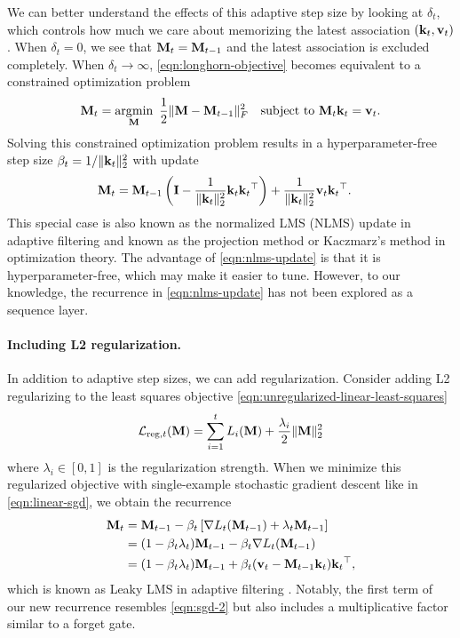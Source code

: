 \documentclass[notitlepage, 11pt]{article}
\begin{document}
We can better understand the effects of this adaptive step size by looking at $\delta_t$, which controls how much we care about memorizing the latest association $(\mathbf{k}_t, \mathbf{v}_t)$.
When $\delta_t = 0$, we see that $\mathbf{M}_t = \mathbf{M}_{t-1}$ and the latest association is excluded completely.
When $\delta_t \to \infty$, \autoref{eqn:longhorn-objective} becomes equivalent to a constrained optimization problem
\begin{align}
\mathbf{M}_{t} = \operatorname*{\arg\!\min}_{\mathbf{M}}\ \frac{1}{2}\lVert\mathbf{M} - \mathbf{M}_{t-1}\rVert_F^2\quad \text{subject to}\  \mathbf{M}_t\mathbf{k}_t = \mathbf{v}_t.\label{eqn:nlms-objective}
\end{align}
Solving this constrained optimization problem results in a hyperparameter-free step size $\beta_t=1/\lVert\mathbf{k}_t\rVert_2^2$ with update
\begin{align}
    \mathbf{M}_{t} &= \mathbf{M}_{t-1}\left(\mathbf{I} - \frac{1}{\lVert\mathbf{k}_t\rVert_2^2} {\mathbf{k}_t\mathbf{k}_t{}^\top}\right) + \frac{1}{ \lVert\mathbf{k}_t\rVert_2^2}\mathbf{v}_t\mathbf{k}_t{}^\top.\label{eqn:nlms-update}
\end{align}
This special case is also known as the normalized LMS (NLMS) update in adaptive filtering \citep{Castoldi2009MinimumdisturbanceDescriptionDevelopment} and known as the projection method \citep{Tanabe1971ProjectionMethodSolving} or Kaczmarz's method \citep{Kaczmarz1937AngenaherteAuflosungSystemen} in optimization theory.
The advantage of \autoref{eqn:nlms-update} is that it is hyperparameter-free, which may make it easier to tune.
However, to our knowledge, the recurrence in \autoref{eqn:nlms-update} has not been explored as a sequence layer.

\paragraph{Including L2 regularization.}
In addition to adaptive step sizes, we can add regularization.
Consider adding L2 regularizing to the least squares objective \autoref{eqn:unregularized-linear-least-squares}
\begin{align}
    \mathcal{L}_{\text{reg}, t}(\mathbf{M}) = \sum_{i=1}^t L_i(\mathbf{M}) + \frac{\lambda_i}{2}\lVert\mathbf{M}\rVert_2^2
\end{align}
where $\lambda_i\in [0, 1]$ is the regularization strength.
When we minimize this regularized objective with single-example stochastic gradient descent like in \autoref{eqn:linear-sgd}, we obtain the recurrence
\begin{align}
    \mathbf{M}_t &= \mathbf{M}_{t-1} -\beta_t \left[\nabla L_t(\mathbf{M}_{t-1}) + \lambda_t \mathbf{M}_{t-1}\right] \\
    &= (1 - \beta_t\lambda_t)\mathbf{M}_{t-1} -\beta_t \nabla L_t(\mathbf{M}_{t-1}) \\
    &= (1 - \beta_t\lambda_t) \mathbf{M}_{t-1} + \beta_t(\mathbf{v}_t - \mathbf{M}_{t-1}\mathbf{k}_t)\mathbf{k}_t{}^\top,\label{eqn:sgd-weight-decay-recurrence}
\end{align}
which is known as Leaky LMS in adaptive filtering \citep{Haykin2014AdaptiveFilterTheory}.
Notably, the first term of our new recurrence resembles \autoref{eqn:sgd-2} but also includes a multiplicative factor similar to a forget gate.
\end{document}
